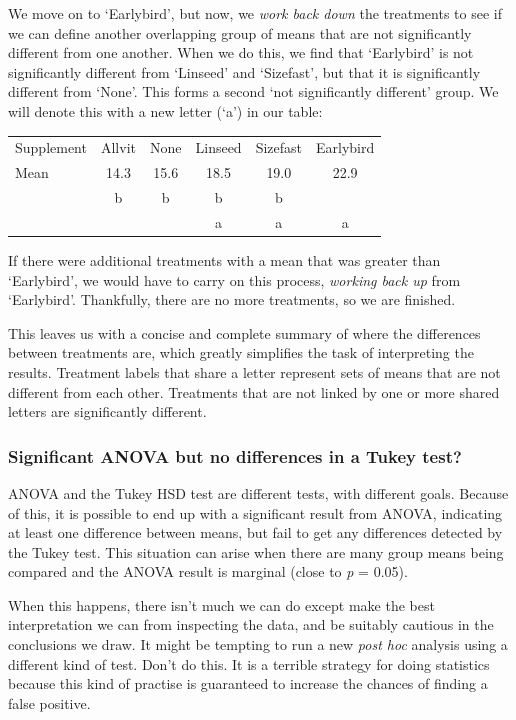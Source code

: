 \documentclass[
]{book}
\newenvironment{greybox}{
  \definecolor{shadecolor}{rgb}{0.95,0.95,0.95}  %
  \color{black}
  \begin{shaded}}
 {\end{shaded}}
\newenvironment{infobox}[1]
  {
  \begin{itemize}
  \renewcommand{\labelitemi}{
    \raisebox{-.7\height}[0pt][0pt]{
      {\setkeys{Gin}{width=3em,keepaspectratio}
        \texttt{[image: images/\#1]}}
    }
  }
  \setlength{\fboxsep}{1em}
  \begin{greybox}
  \item
  }
  {
  \end{greybox}
  \end{itemize}
  }
\begin{document}
We move on to `Earlybird', but now, we \emph{work back down} the treatments to see if we can define another overlapping group of means that are not significantly different from one another. When we do this, we find that `Earlybird' is not significantly different from `Linseed' and `Sizefast', but that it is significantly different from `None'. This forms a second `not significantly different' group. We will denote this with a new letter (`a') in our table:

\begin{longtable}[]{@{}lccccc@{}}
\toprule()
\endhead
Supplement & Allvit & None & Linseed & Sizefast & Earlybird \\
Mean & 14.3 & 15.6 & 18.5 & 19.0 & 22.9 \\
& b & b & b & b & \\
& & & a & a & a \\
\bottomrule()
\end{longtable}

If there were additional treatments with a mean that was greater than `Earlybird', we would have to carry on this process, \emph{working back up} from `Earlybird'. Thankfully, there are no more treatments, so we are finished.

This leaves us with a concise and complete summary of where the differences between treatments are, which greatly simplifies the task of interpreting the results. Treatment labels that share a letter represent sets of means that are not different from each other. Treatments that are not linked by one or more shared letters are significantly different.

\begin{infobox}{warning}

\hypertarget{significant-anova-but-no-differences-in-a-tukey-test}{%
\subsubsection*{Significant ANOVA but no differences in a Tukey test?}\label{significant-anova-but-no-differences-in-a-tukey-test}}

ANOVA and the Tukey HSD test are different tests, with different goals. Because of this, it is possible to end up with a significant result from ANOVA, indicating at least one difference between means, but fail to get any differences detected by the Tukey test. This situation can arise when there are many group means being compared and the ANOVA result is marginal (close to \emph{p} = 0.05).

When this happens, there isn't much we can do except make the best interpretation we can from inspecting the data, and be suitably cautious in the conclusions we draw. It might be tempting to run a new \emph{post hoc} analysis using a different kind of test. Don't do this. It is a terrible strategy for doing statistics because this kind of practise is guaranteed to increase the chances of finding a false positive.

\end{infobox}
\end{document}
